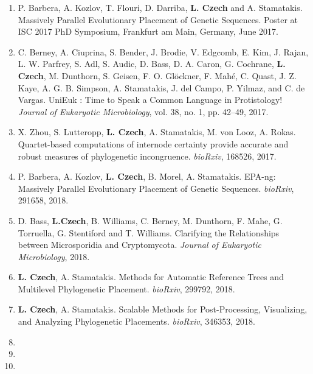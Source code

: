 \begin{enumerate}
    \item P. Barbera, A. Kozlov, T. Flouri, D. Darriba, \textbf{L. Czech} and A. Stamatakis.
        Massively Parallel Evolutionary Placement of Genetic Sequences.
        Poster at ISC 2017 PhD Symposium, Frankfurt am Main, Germany, June 2017.

    \item C. Berney, A. Ciuprina, S. Bender, J. Brodie, V. Edgcomb, E. Kim, J. Rajan, L. W. Parfrey, S. Adl, S. Audic,
        D. Bass, D. A. Caron, G. Cochrane, \textbf{L. Czech}, M. Dunthorn, S. Geisen, F. O. Glöckner, F. Mahé, C. Quast,
        J. Z. Kaye, A. G. B. Simpson, A. Stamatakis, J. del Campo, P. Yilmaz, and C. de Vargas.
        UniEuk : Time to Speak a Common Language in Protistology!
        \textit{Journal of Eukaryotic Microbiology}, vol. 38, no. 1, pp. 42–49, 2017.

    \item X. Zhou, S. Lutteropp, \textbf{L. Czech}, A. Stamatakis, M. von Looz, A. Rokas.
        Quartet-based computations of internode certainty provide accurate and robust measures of phylogenetic incongruence.
        \textit{bioRxiv}, 168526, 2017.

    \item P. Barbera, A. Kozlov, \textbf{L. Czech}, B. Morel, A. Stamatakis.
        EPA-ng: Massively Parallel Evolutionary Placement of Genetic Sequences.
        \textit{bioRxiv}, 291658, 2018.

    \item D. Bass, \textbf{L.Czech}, B. Williams, C. Berney, M. Dunthorn, F. Mahe, G. Torruella, G. Stentiford and T. Williams.
        Clarifying the Relationships between Microsporidia and Cryptomycota.
        \textit{Journal of Eukaryotic Microbiology}, 2018.

    \item \textbf{L. Czech}, A. Stamatakis.
        Methods for Automatic Reference Trees and Multilevel Phylogenetic Placement.
        \textit{bioRxiv}, 299792, 2018.

    \item \textbf{L. Czech}, A. Stamatakis.
        Scalable Methods for Post-Processing, Visualizing, and Analyzing Phylogenetic Placements.
        \textit{bioRxiv}, 346353, 2018.

    \item {}
    \item {}
    \item {}
\end{enumerate}

\clearpage
